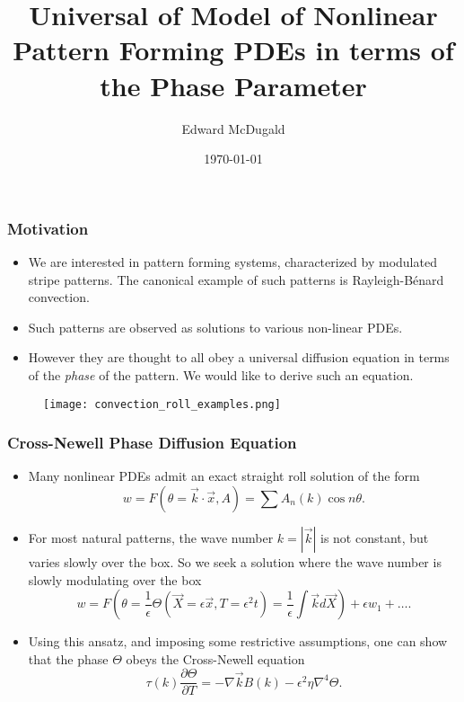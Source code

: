 \documentclass[]{beamer}
\title{Universal of Model of Nonlinear Pattern Forming PDEs in terms of the Phase Parameter}
\author{Edward McDugald}
\institute{University of Arizona}
\date{\today}
\begin{document}
\begin{frame}
  \titlepage
\end{frame}

\begin{frame}
    \frametitle{Motivation}
    \begin{itemize}
        \item We are interested in pattern forming systems, characterized by modulated stripe patterns. The canonical example of such patterns is Rayleigh-B\'{e}nard convection.
        \item Such patterns are observed as solutions to various non-linear PDEs. 
        \item However they are thought to all obey a universal diffusion equation in terms of the \emph{phase} of the pattern. We would like to derive such an equation.
     \end{itemize}
        \begin{figure}
        \centering
        \texttt{[image: convection\_roll\_examples.png]}
        \end{figure}
\end{frame}

\begin{frame}
     \frametitle{Cross-Newell Phase Diffusion Equation}
     \begin{itemize}
 \item Many nonlinear PDEs admit an exact straight roll solution of the form
     \[
         w = F(\theta=\vec{k}\cdot\vec{x},A) = \sum A_n(k)\cos{n\theta}.
     \] 
 \item For most natural patterns, the wave number $k=|\vec{k}|$ is not constant, but varies slowly over the box. So we seek a solution where the wave number is slowly modulating over the box
     \[
         w = F(\theta = \frac{1}{\epsilon}\Theta(\vec{X}=\epsilon\vec{x},T=\epsilon^2 t) = \frac{1}{\epsilon}\int \vec{k}d\vec{X}) + \epsilon w_1 + \dots.
     \] 
\item Using this ansatz, and imposing some restrictive assumptions, one can show that the phase $\Theta$ obeys the Cross-Newell equation
    \[
        \tau(k)\frac{\partial \Theta}{\partial T} = -\nabla \vec{k}B(k) - \epsilon^2 \eta \nabla^4 \Theta.
    \] 
     \end{itemize}
\end{frame}
\end{document}
